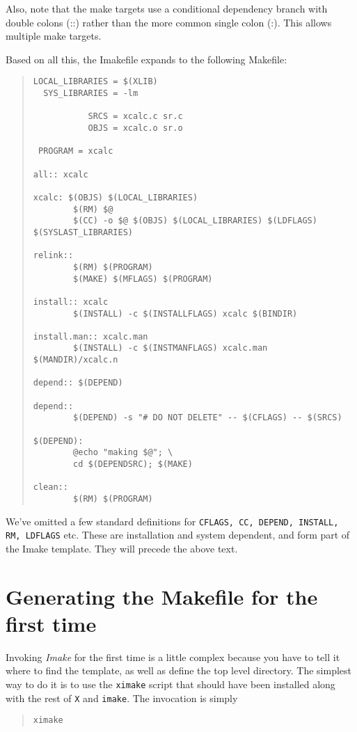 Also, note that the make targets use a conditional dependency branch
with double colons (::) rather than the more common single colon (:).
This allows multiple make targets.

Based on all this, the Imakefile expands to the following Makefile:

\begin{quote}
\begin{verbatim}
LOCAL_LIBRARIES = $(XLIB)
  SYS_LIBRARIES = -lm

           SRCS = xcalc.c sr.c
           OBJS = xcalc.o sr.o

 PROGRAM = xcalc

all:: xcalc

xcalc: $(OBJS) $(LOCAL_LIBRARIES)
        $(RM) $@
        $(CC) -o $@ $(OBJS) $(LOCAL_LIBRARIES) $(LDFLAGS) $(SYSLAST_LIBRARIES)

relink::
        $(RM) $(PROGRAM)
        $(MAKE) $(MFLAGS) $(PROGRAM)

install:: xcalc
        $(INSTALL) -c $(INSTALLFLAGS) xcalc $(BINDIR)

install.man:: xcalc.man
        $(INSTALL) -c $(INSTMANFLAGS) xcalc.man $(MANDIR)/xcalc.n

depend:: $(DEPEND)

depend::
        $(DEPEND) -s "# DO NOT DELETE" -- $(CFLAGS) -- $(SRCS)

$(DEPEND):
        @echo "making $@"; \
        cd $(DEPENDSRC); $(MAKE)

clean::
        $(RM) $(PROGRAM)
\end{verbatim}
\end{quote}


We've omitted a few standard definitions for {\tt CFLAGS, CC, DEPEND,
INSTALL, RM, LDFLAGS} etc. These are installation and system
dependent, and form part of the Imake template. They will precede the
above text.

\section{Generating the Makefile for the first time}

Invoking {\em Imake} for the first time is a little complex because
you have to tell it where to find the template, as well as define the
top level directory. The simplest way to do it is to use the {\tt ximake} 
script that should have been installed along with the rest of
{\tt X} and {\tt imake}. The invocation is simply 
\begin{quote}
{\tt ximake}
\end{quote}

